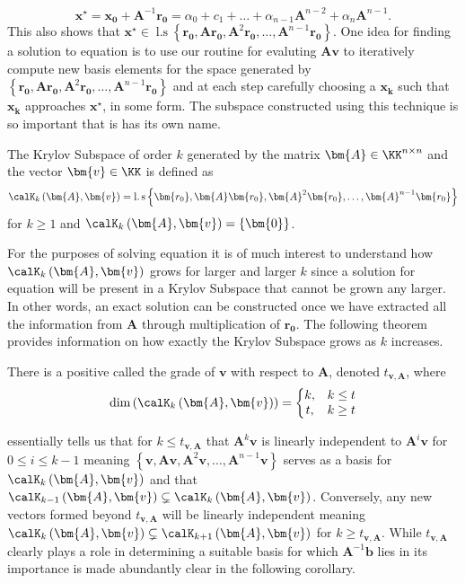 \[
    \bm{x^{\star}} = \bm{x_0} + \bm{A}^{-1} \bm{r_0} = \alpha_0 + c_1 + \ldots + \alpha_{n-1} \bm{A}^{n-2} + \alpha_{n} \bm{A}^{n-1}.
\]
This also shows that $\bm{x^{\star}} \in \operatorname{l.s} \left\{ \bm{r_0}, \bm{A} \bm{r_0}, \bm{A}^2 \bm{r_0}, \ldots , \bm{A}^{n-1} \bm{r_0} \right\}$. One idea for finding a solution to equation   is to use our routine for evaluting $\bm{A} \bm{v}$ to iteratively compute new basis elements for the space generated by $\left\{ \bm{r_0}, \bm{A} \bm{r_0}, \bm{A}^2 \bm{r_0}, \ldots , \bm{A}^{n-1} \bm{r_0} \right\}$ and at each step carefully choosing a $\bm{x_k}$ such that $\bm{x_k}$ approaches $\bm{x^{\star}}$, in some form. The subspace constructed using this technique is so important that is has its own name.
\begin{defe} \label{defe: krylov_subspace}
    The Krylov Subspace of order $k$ generated by the matrix $\bm{A} \in \KK^{n \times n}$ and the vector $\bm{v} \in \KK$ is defined as
    \[
        \calK_{k} \left( \bm{A},\bm{v} \right) = \operatorname{l.s} \left\{ \bm{r_0}, \bm{A} \bm{r_0}, \bm{A}^2 \bm{r_0}, \ldots , \bm{A}^{n-1} \bm{r_0} \right\}
    \]
    for $k \geq 1$ and $\calK_{k} \left( \bm{A},\bm{v} \right) = \left\{ \bm{0} \right\}$.
\end{defe}
For the purposes of solving equation   it is of much interest to understand how $\calK_{k} \left( \bm{A},\bm{v} \right)$ grows for larger and larger $k$ since a solution for equation   will be present in a Krylov Subspace that cannot be grown any larger. In other words, an exact solution can be constructed once we have extracted all the information from $\bm{A}$ through multiplication of $\bm{r_0}$. The following theorem provides information on how exactly the Krylov Subspace grows as $k$ increases.
\begin{thm} \label{theorem: grade_of_v}
    There is a positive called the grade of $\bm{v}$ with respect to $\bm{A}$, denoted $t_{\bm{v}, \bm{A}}$, where
    \[
        \operatorname{dim} \left( \calK_{k} \left( \bm{A} , \bm{v} \right) \right) = \left\{
        \begin{matrix}
            k, & k \leq t \\
            t, & k \geq t
        \end{matrix}
        \right.
    \]
\end{thm}
 essentially tells us that for $k \leq t_{\bm{v}, \bm{A}}$ that $\bm{A}^k \bm{v}$ is linearly independent to $\bm{A}^i \bm{v}$ for $0 \leq i \leq k-1$ meaning $\left\{ \bm{v}, \bm{A} \bm{v}, \bm{A}^2 \bm{v}, \ldots , \bm{A}^{n-1} \bm{v} \right\}$ serves as a basis for $\calK_{k} \left( \bm{A},\bm{v} \right)$ and that $\calK_{k-1} \left( \bm{A},\bm{v} \right) \subsetneq \calK_{k} \left( \bm{A},\bm{v} \right)$. Conversely, any new vectors formed beyond $t_{\bm{v}, \bm{A}}$ will be linearly independent meaning $\calK_{k} \left( \bm{A},\bm{v} \right) \subsetneq \calK_{k+1} \left( \bm{A},\bm{v} \right)$ for $k \geq t_{\bm{v}, \bm{A}}$. While $t_{\bm{v}, \bm{A}}$ clearly plays a role in determining a suitable basis for which $\bm{A}^{-1} \bm{b}$ lies in its importance is made abundantly clear in the following corollary.
